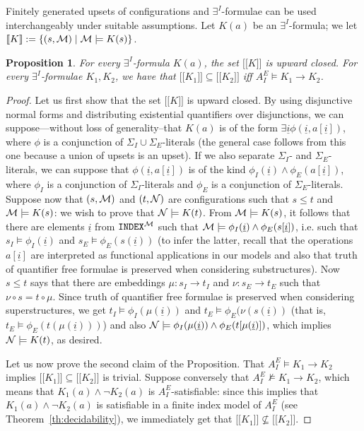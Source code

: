 \documentclass{LMCS}
\newcommand{\ui}{\ensuremath{\underline i}}
\newcommand{\cM}{\ensuremath \mathcal M}
\newcommand{\cN}{\ensuremath \mathcal N}
\newcommand{\mywidehat}[1]{\ensuremath{\lbrack\!\lbrack #1 \rbrack\!\rbrack}}
\theoremstyle{plain}\newtheorem{assumption}[thm]{Assumption}
\theoremstyle{plain}\newtheorem{proposition}[thm]{Proposition}
\theoremstyle{plain}\newtheorem{property}[thm]{Property}
\theoremstyle{plain}\newtheorem{example}[thm]{Example}
\theoremstyle{plain}\newtheorem{claim}[thm]{Claim}
\theoremstyle{plain}\newtheorem{lemma}[thm]{Lemma}
\begin{document}
Finitely generated upsets of configurations and $\exists^I$-formulae
can be used interchangeably under suitable assumptions.  Let $K(a)$ be
an $\exists^I$-formula; we let $\mywidehat{K} :=\{ (s,\cM)\mid
\cM\models K(s)\}$.
\begin{proposition}
  \label{prop:conf}
  For every $\exists^I$-formula $K(a)$, the set $\mywidehat{K}$ is
  upward closed.  For every $\exists^I$-formulae $K_1, K_2$, we have
  that $\mywidehat{K_1}\subseteq \mywidehat{K_2}$ iff $A_I^E\models
  K_1\to K_2$.
\end{proposition}
\begin{proof}
  Let us first show that the set $\mywidehat{K}$ is upward closed. By
  using disjunctive normal forms and distributing existential
  quantifiers over disjunctions, we can suppose---without loss of
  generality--that $K(a)$ is of the form $\exists \ui \phi(\ui,
  a[\ui])$, where $\phi$ is a conjunction of $\Sigma_I\cup
  \Sigma_E$-literals (the general case follows from this one because a
  union of upsets is an upset). If we also separate $\Sigma_I$- and
  $\Sigma_E$-literals, we can suppose that $\phi(\ui, a[\ui])$ is of
  the kind $\phi_I(\ui)\wedge \phi_E(a[\ui])$, where $\phi_I$ is a
  conjunction of $\Sigma_I$-literals and $\phi_E$ is a conjunction of
  $\Sigma_E$-literals. Suppose now that $(s, \cM)$ and $(t, \cN)$ are
  configurations such that $s\leq t$ and $\cM\models K(s)$: we wish to
  prove that $\cN\models K(t)$. From $\cM\models K(s)$, it follows
  that there are elements $\ui$ from ${\tt INDEX}^{\cM}$ such that
  $\cM\models \phi_I(\ui)\wedge\phi_E(s[\ui])$, i.e. such that
  $s_I\models \phi_I(\ui)$ and $s_E\models \phi_E(s(\ui))$ (to infer
  the latter, recall that the operations $a[\ui]$ are interpreted as
  functional applications in our models and also that truth of
  quantifier free formulae is preserved when considering
  substructures). Now $s\leq t$ says that there are embeddings
  $\mu:s_I\longrightarrow t_I$ and $\nu:s_E\longrightarrow t_E$ such
  that $\nu\circ s= t\circ \mu$. Since truth of quantifier free
  formulae is preserved when considering superstructures, we get
  $t_I\models\phi_I(\mu(\ui))$ and $t_E\models\phi_E(\nu(s(\ui))$
  (that is, $t_E\models\phi_E(t(\mu(\ui)))$) and also $\cN\models
  \phi_I(\mu(\ui))\wedge \phi_E(t[\mu(\ui)])$, which implies
  $\cN\models K(t)$, as desired.

  Let us now prove the second claim of the Proposition. That
  $A^E_I\models K_1\to K_2$ implies $\mywidehat{K_1}\subseteq
  \mywidehat{K_2}$ is trivial. Suppose conversely that
  $A^E_I\not\models K_1\to K_2$, which means that $K_1(a)\wedge \neg
  K_2(a)$ is $A^E_I$-satisfiable: since this implies that
  $K_1(a)\wedge \neg K_2(a)$ is satisfiable in a finite index model of
  $A^E_I$ (see Theorem~\ref{th:decidability}), we immediately get that
  $\mywidehat{K_1}\not\subseteq \mywidehat{K_2}$.
\end{proof}
\end{document}
